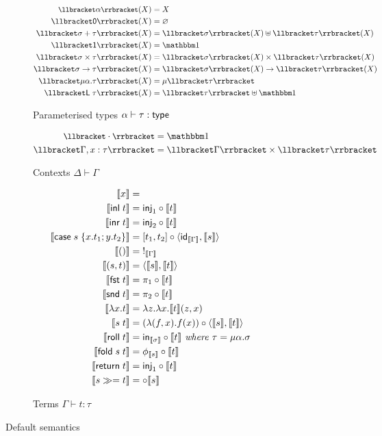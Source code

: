 \begin{figure}
\begin{subfigure}{\linewidth}
  \begin{align*}
  \small
  \sem{\alpha}(X) &= X
  \\
  \sem{\tyZero}(X) &= \varnothing
  \\
  \sem{\sigma \tySum \tau}(X) &= \sem{\sigma}(X) \uplus \sem{\tau}(X)
  \\
  \sem{\tyUnit}(X) &= \One
  \\
  \sem{\sigma \tyProd \tau}(X) &= \sem{\sigma}(X) \times \sem{\tau}(X)
  \\
  \sem{\sigma \tyFun \tau}(X) &= \sem{\sigma}(X) \to \sem{\tau}(X)
  \\
  \sem{\mu\alpha.\tau}(X) &= \mu\sem{\tau}
  \\
  \sem{\tyLift\;\tau}(X) &= \sem{\tau} \uplus \One
  \end{align*}
  \caption{Parameterised types $\alpha \vdash \tau: \mathsf{type}$}
  \label{fig:default-semantics:types}
\end{subfigure}
\begin{subfigure}{\linewidth}
  \begin{align*}
  \small
  \sem{\emptyCxt} &= \One
  \\
  \sem{\Gamma, x: \tau} &= \sem{\Gamma} \times \sem{\tau}
  \end{align*}
  \caption{Contexts $\Delta \vdash \Gamma$}
\end{subfigure}
\begin{subfigure}{\linewidth}
  \begin{align*}
  \small
  \llbracket x \rrbracket &=
  \\
  \llbracket \mathsf{inl}\;t \rrbracket &= \mathsf{inj}_1 \circ \llbracket t \rrbracket
  \\
  \llbracket \mathsf{inr}\;t \rrbracket &= \mathsf{inj}_2 \circ \llbracket t \rrbracket
  \\
  \llbracket \mathsf{case}\;s\;\{x.t_1; y.t_2\} \rrbracket &= [t_1, t_2] \circ \langle \mathsf{id}_{\llbracket \Gamma \rrbracket}, \llbracket s \rrbracket\rangle
  \\
  \llbracket () \rrbracket &=\;!_{\llbracket \Gamma \rrbracket}
  \\
  \llbracket (s,t) \rrbracket &= \langle \llbracket s \rrbracket, \llbracket t \rrbracket\rangle
  \\
  \llbracket \mathsf{fst}\;t \rrbracket &= \pi_1 \circ \llbracket t \rrbracket
  \\
  \llbracket \mathsf{snd}\;t \rrbracket &= \pi_2 \circ \llbracket t \rrbracket
  \\
  \llbracket \lambda x.t \rrbracket &= \lambda z.\lambda x.\llbracket t \rrbracket(z, x)
  \\
  \llbracket s\;t \rrbracket &= (\lambda (f, x).f(x)) \circ \langle \llbracket s \rrbracket, \llbracket t \rrbracket\rangle
  \\
  \llbracket \mathsf{roll}\;t \rrbracket &= \mathsf{in}_{\llbracket \sigma \rrbracket} \circ \llbracket t \rrbracket
  \textit{ where }\tau = \mu\alpha.\sigma
  \\
  \llbracket \mathsf{fold}\;s\;t \rrbracket &= \phi_{\llbracket s \rrbracket} \circ \llbracket t \rrbracket
  \\
  \llbracket \mathsf{return}\;t \rrbracket &= \mathsf{inj}_1 \circ \llbracket t \rrbracket
  \\
  \llbracket {s}\gg={t} \rrbracket &=
  \circ \llbracket s \rrbracket
  \end{align*}
  \caption{Terms $\Gamma \vdash t: \tau$}
\end{subfigure}
\caption{Default semantics}
\end{figure}
